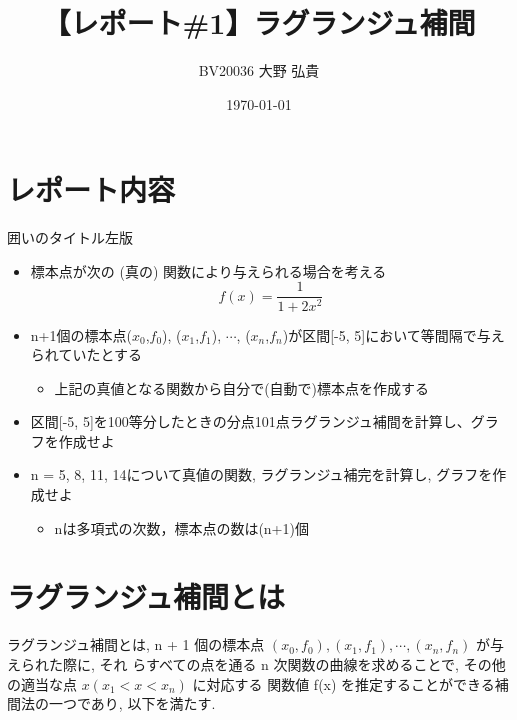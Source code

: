 \documentclass[titlepage, a4paper, 11pt, dvipdfmx]{jsarticle}
\title{\Huge【レポート\#1】ラグランジュ補間}%
\date{\today}%
\author{\Large BV20036 \quad 大野 弘貴}%
\begin{document}
\maketitle
{}
\newpage
{}


\section{レポート内容}
\begin{itembox}[l]{囲いのタイトル左版}
    \begin{itemize}
        \item 標本点が次の (真の) 関数により与えられる場合を考える\\
      $$ f(x)=\frac{1}{1+2x^2} $$
        \item n+1個の標本点($x_0$,$f_0$), ($x_1$,$f_1$), $ \cdots $, ($x_n$,$f_n$)が区間[-5, 5]において等間隔で与えられていたとする
        \begin{itemize}
            \item 上記の真値となる関数から自分で(自動で)標本点を作成する
        \end{itemize} 
        \item 区間[-5, 5]を100等分したときの分点101点ラグランジュ補間を計算し、グラフを作成せよ
        \item n = 5, 8, 11, 14について真値の関数, ラグランジュ補完を計算し, グラフを作成せよ
        \begin{itemize}
            \item nは多項式の次数，標本点の数は(n+1)個
        \end{itemize} 
  \end{itemize}
\end{itembox}
\section{ラグランジュ補間とは}
ラグランジュ補間とは, n + 1 個の標本点 $(x_0, f_0), (x_1, f_1), \cdots , (x_n, f_n)$ が与えられた際に, それ らすべての点を通る n 次関数の曲線を求めることで, その他の適当な点 $x(x_1 < x < x_n)$ に対応する
  関数値 f(x) を推定することができる補間法の一つであり, 以下を満たす.
\end{document}

